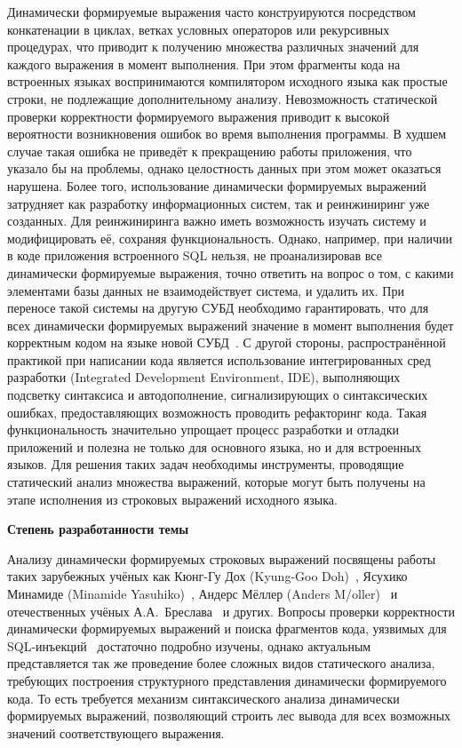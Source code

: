 Динамически формируемые выражения часто конструируются посредством конкатенации в циклах, ветках условных операторов или рекурсивных процедурах, что приводит к получению множества различных значений для каждого выражения в момент выполнения. При этом фрагменты кода на встроенных  языках воспринимаются компилятором исходного языка как простые строки, не подлежащие дополнительному анализу. Невозможность статической проверки корректности формируемого выражения приводит к высокой вероятности возникновения ошибок во время выполнения программы. В худшем случае такая ошибка не приведёт к прекращению работы приложения, что указало бы на проблемы, однако целостность данных при этом может оказаться нарушена. Более того, использование динамически формируемых выражений затрудняет как разработку информационных систем, так и реинжиниринг уже созданных. Для реинжиниринга важно иметь возможность изучать систему и модифицировать её, сохраняя функциональность. Однако, например, при наличии в коде приложения встроенного SQL нельзя, не проанализировав все динамически формируемые выражения, точно ответить на вопрос о том, с какими элементами базы данных не взаимодействует система, и удалить их. При переносе такой системы на другую СУБД необходимо гарантировать, что для всех динамически формируемых выражений значение в момент выполнения будет корректным кодом на языке новой СУБД~\cite{JSquash}. С другой стороны, распространённой практикой при написании кода является использование интегрированных сред разработки (Integrated Development Environment, IDE), выполняющих подсветку синтаксиса и автодополнение, сигнализирующих о синтаксических ошибках, предоставляющих возможность проводить рефакторинг кода. Такая функциональность значительно упрощает процесс разработки и отладки приложений и полезна не только для основного языка, но и для встроенных языков. Для решения таких задач необходимы инструменты, проводящие статический анализ множества выражений, которые могут быть получены на этапе исполнения из строковых выражений исходного языка.


\textbf{Степень разработанности темы}

Анализу динамически формируемых строковых выражений посвящены работы таких зарубежных учёных как Кюнг-Гу Дох (Kyung-Goo Doh)~\cite{LrAbstract1,LrAbstract2,LRAbstractParsingSema}, Ясухико Минамиде (Minamide Yasuhiko)~\cite{PHPSA}, Андерс Мёллер (Anders M/oller)~\cite{JSA} и отечественных учёных А.А.~Бреслава~\cite{Alvor1,Alvor2} и других. Вопросы проверки корректности динамически формируемых выражений и поиска фрагментов кода, уязвимых для SQL-инъекций~\cite{SQLInjection,Dasgupta:2009:SAF:1546683.1547548} достаточно подробно изучены, однако актуальным представляется так же проведение более сложных видов статического анализа, требующих построения структурного представления динамически формируемого кода. То есть требуется механизм синтаксического анализа динамически формируемых выражений, позволяющий строить лес вывода для всех возможных значений соответствующего выражения. 

